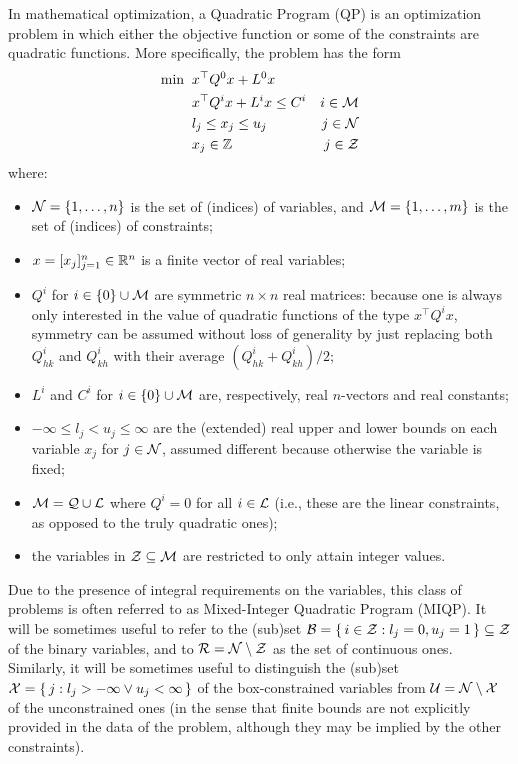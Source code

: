 In mathematical optimization, a Quadratic Program (QP) is an optimization problem in which either the objective function or some of the constraints are quadratic functions. More specifically, the problem has the form
%
\begin{align*}	
 \min \;\;
 & x^\top Q^0 x + L^0 x \\
 & x^\top Q^i x + L^i x \leq C^i & i \in \mathcal{M} \\ 
 & l_j \leq x_j \leq u_j & j \in \mathcal{N}  \\
 & x_j \in \mathbb{Z} & j \in \mathcal{Z}
\end{align*}
%
where:
%
\begin{itemize}
 \item $\mathcal{N} = \{ 1, \ldots, n \}$ is the set of (indices) of variables, and $\mathcal{M} = \{ 1, \ldots, m \}$ is the set of (indices) of constraints;
 \item $x = [x_j]_{j = 1}^n \in \mathbb{R}^n$ is a finite vector of real variables;
 \item $Q^i$ for $i \in \{ 0 \} \cup \mathcal{M}$ are symmetric $n \times n$ real matrices: because one is always only interested in the value of quadratic functions of the type $x^\top Q^i x$, symmetry can be assumed without loss of generality by just replacing both $Q^i_{hk}$ and $Q^i_{kh}$ with their average $(Q^i_{hk} + Q^i_{kh}) / 2$;
 \item $L^i$ and $C^i$ for $i \in \{ 0 \} \cup \mathcal{M}$ are, respectively, real $n$-vectors and real constants;
 \item $-\infty \leq l_j < u_j \leq \infty$ are the (extended) real upper and lower bounds on each variable $x_j$ for $j \in \mathcal{N}$, assumed different because otherwise the variable is fixed;
 \item $\mathcal{M} = \mathcal{Q} \cup \mathcal{L}$ where $Q^i = 0$ for all $i \in \mathcal{L}$ (i.e., these are the linear constraints, as opposed to the truly quadratic ones);
 \item the variables in $\mathcal{Z} \subseteq \mathcal{M}$ are restricted to only attain integer values.
\end{itemize}
%
Due to the presence of integral requirements on the variables, this class of problems is often referred to as Mixed-Integer Quadratic Program (MIQP). It will be sometimes useful to refer to the (sub)set $\mathcal{B} =  \{ \, i \in \mathcal{Z} : l_j = 0 , u_j = 1 \, \} \subseteq \mathcal{Z}$ of the binary variables, and to $\mathcal{R} = \mathcal{N} \setminus \mathcal{Z}$ as the set of continuous ones. Similarly, it will be sometimes useful to distinguish the (sub)set $\mathcal{X} = \{ \, j : l_j > -\infty \lor u_j < \infty \, \}$ of the box-constrained variables from $\mathcal{U} = \mathcal{N} \setminus \mathcal{X}$ of the unconstrained ones (in the sense that finite bounds are not explicitly provided in the data of the problem, although they may be implied by the other constraints).

